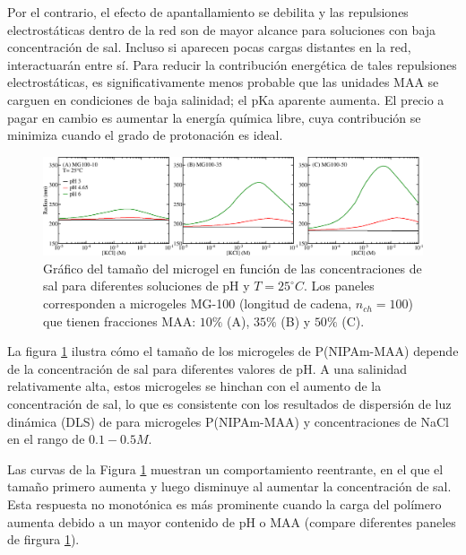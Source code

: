 Por el contrario, el efecto de apantallamiento se debilita y las repulsiones electrost\'aticas dentro de la red son de mayor alcance para soluciones con baja concentraci\'on de sal.
Incluso si aparecen pocas cargas distantes en la red, interactuar\'an entre s\'i.
Para reducir la contribuci\'on energ\'etica de tales repulsiones electrost\'aticas, es significativamente menos probable que las unidades MAA se carguen en condiciones de baja salinidad;
el pKa aparente aumenta.
El precio a pagar en cambio es aumentar la energ\'ia química libre, cuya contribuci\'on se minimiza cuando el grado de protonaci\'on es ideal.



\begin{figure}[!htb]
	\centering
	\includegraphics[width=1\linewidth]{Figures/graph-gel/R-cs.png}
	\caption{Gr\'afico del tama\~no del microgel en funci\'on de las concentraciones de sal para diferentes soluciones de pH y $T=25 ^\circ C$.
		Los paneles corresponden a microgeles MG-100 (longitud de cadena, $n_{ch}=100$) que tienen fracciones MAA: $10\%$ (A), $35\%$ (B) y $50\%$ (C).}
	\label{fig:R-cs}
\end{figure}

La figura \ref{fig:R-cs} ilustra c\'omo el tama\~no de los microgeles de P(NIPAm-MAA) depende de la concentraci\'on de sal para diferentes valores de pH.
A una salinidad relativamente alta, estos microgeles se hinchan con el aumento de la concentraci\'on de sal, lo que es consistente con los resultados de dispersi\'on de luz din\'amica (DLS) de  para microgeles P(NIPAm-MAA) y concentraciones de NaCl en el rango de $0.1-0.5 M$.

Las curvas de la Figura \ref{fig:R-cs} muestran un comportamiento reentrante, en el que el tama\~no primero aumenta y luego disminuye al aumentar la concentración de sal.
Esta respuesta no monot\'onica es m\'as prominente cuando la carga del pol\'imero aumenta debido a un mayor contenido de pH o MAA (compare diferentes paneles de firgura \ref{fig:R-cs}).




